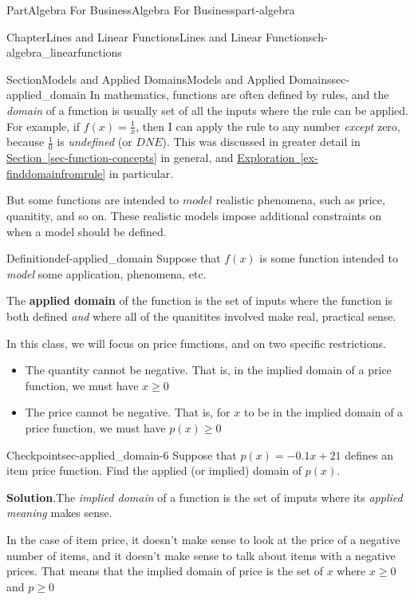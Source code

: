 \documentclass{tufte-book}
\newcommand{\blocktitlefont}{\relax}
\newcommand{\xreffont}{\relax}
\newcommand{\terminology}[1]{\textbf{#1}}
\numberwithin{equation}{chapter}
\begin{document}
\begin{partptx}{Part}{Algebra For Business}{}{Algebra For Business}{}{}{part-algebra}
\begin{chapterptx}{Chapter}{Lines and Linear Functions}{}{Lines and Linear Functions}{}{}{ch-algebra_linearfunctions}
\typeout{************************************************}
%
\begin{sectionptx}{Section}{Models and Applied Domains}{}{Models and Applied Domains}{}{}{sec-applied_domain}
In mathematics, functions are often defined by rules, and the  \emph{domain} of a function is usually set of all the inputs where the rule can be applied.  For example, if \(f(x) = \frac{1}{x}\), then I can apply the rule to any number \emph{except} zero, because \(\frac{1}{0}\) is \emph{undefined} (or \(DNE\)). This was discussed in greater detail in \hyperref[sec-function-concepts]{Section~{\xreffont\ref{sec-function-concepts}}} in general, and \hyperref[ex-finddomainfromrule]{Exploration~{\xreffont\ref{ex-finddomainfromrule}}} in particular.%
\par
But some functions are intended to \(model\) realistic phenomena, such as price, quanitity, and so on.  These realistic models impose additional constraints on when a model should be defined.%
\begin{definition}{Definition}{}{def-applied_domain}%
Suppose that \(f(x)\) is some function intended to \emph{model} some application, phenomena, etc.%
\par
The \terminology{applied domain} of the function is the set of inputs where the function is both defined \emph{and} where all of the quanitites involved make real, practical sense.%
\end{definition}
In this class, we will focus on price functions, and on two specific restrictions.%
\begin{itemize}[label=\textbullet]
\item{}The quantity cannot be negative.  That is, in the implied domain of a price function, we must have \(x\geq 0\)%
\item{}The price cannot be negative.  That is, for \(x\) to be in the implied domain of a price function, we must have \(p(x) \geq 0\)%
\end{itemize}
%
\begin{inlineexercise}{Checkpoint}{}{sec-applied_domain-6}%
Suppose that \(p(x) = -0.1x + 21\) defines an item price function. Find the applied (or implied) domain of \(p(x)\).%
\par\smallskip%
\noindent\textbf{\blocktitlefont Solution}.\hypertarget{sec-applied_domain-6-2}{}\quad{}The \emph{implied domain} of a function is the set of imputs where its \emph{applied meaning} makes sense.%
\par
In the case of item price, it doesn't make sense to look at the price of a negative number of items, and it doesn't make sense to talk about items with a negative prices.  That means that the implied domain of price is the set of \(x\) where \(x\geq 0\) and \(p\geq 0\)%

\end{inlineexercise}
\end{sectionptx}
\end{chapterptx}
\end{partptx}
\end{document}
